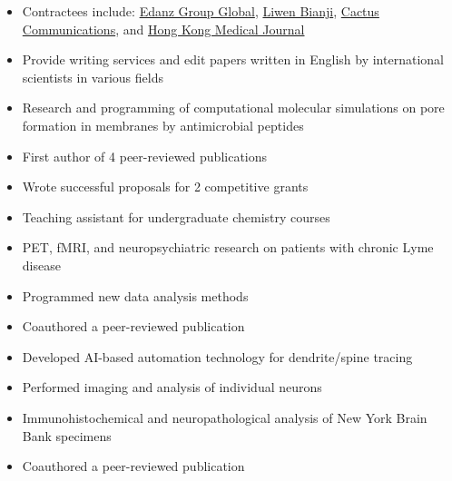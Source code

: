 \documentclass[10pt,a4paper]{altacv}
\begin{document}
\divider

\begin{itemize}
\item Contractees include: 
\href{https://www.edanzediting.com/}{Edanz Group Global}, 
\href{https://www.liwenbianji.cn/}{Liwen Bianji}, 
\href{https://www.cactusglobal.com/}{Cactus Communications}, and
\href{https://www.hkmj.org/}{Hong Kong Medical Journal}
\item Provide writing services and edit papers written in English by international scientists in various fields
\end{itemize}

\divider

\begin{itemize}
\item Research and programming of computational molecular simulations on pore formation in membranes by antimicrobial peptides 
\item First author of 4 peer-reviewed publications
\item Wrote successful proposals for 2 competitive grants
\item Teaching assistant for undergraduate chemistry courses
\end{itemize}

\divider

\begin{itemize}
\item PET, fMRI, and neuropsychiatric research on patients with chronic Lyme disease
\item Programmed new data analysis methods
\item Coauthored a peer-reviewed publication
\end{itemize}

\divider

\begin{itemize}
\item Developed AI-based automation technology for dendrite/spine tracing
\item Performed imaging and analysis of individual neurons
\item Immunohistochemical and neuropathological analysis of New York Brain Bank specimens
\item Coauthored a peer-reviewed publication
\end{itemize}
\end{document}
